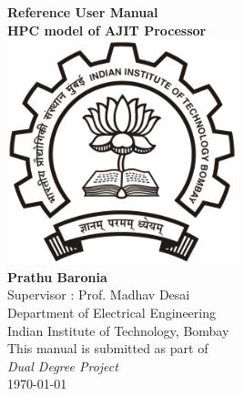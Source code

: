 
\begin{titlepage}

\begin{center}

\huge \textbf{Reference User Manual \\ HPC model of AJIT Processor}\\[2.5cm]

\includegraphics[width=0.5\textwidth]{img/logo.png}~\\[1cm]



{\Large \textbf{Prathu Baronia}}\\[0.5cm]
{\Large Supervisor : Prof. Madhav Desai}\\[0.5cm]

{\large Department of Electrical Engineering} \\ [-0.3cm]
{\large Indian Institute of Technology, Bombay}\\[1.5cm]

{ \large This manual is submitted as part of \\ \textit{Dual Degree Project}}\\[1cm]



{\large \today}

\end{center}

\end{titlepage}
\afterpage{\blankpage}
\clearpage

